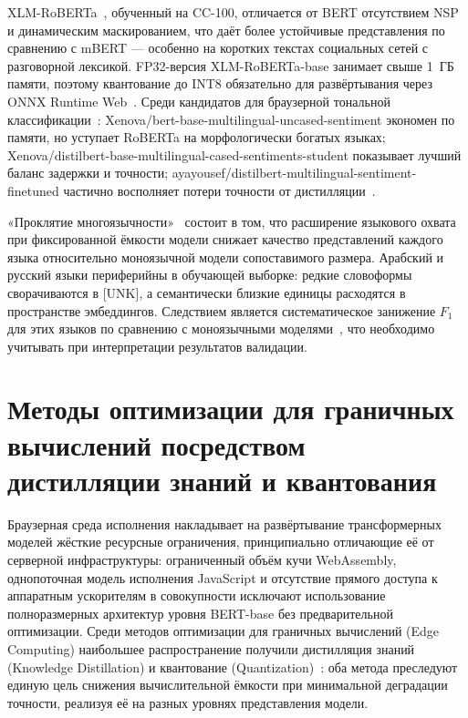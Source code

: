 XLM-RoBERTa~\cite{conneau2020unsupervised}, обученный на CC-100, отличается от BERT отсутствием NSP и динамическим маскированием, что даёт более устойчивые представления по сравнению с mBERT — особенно на коротких текстах социальных сетей с разговорной лексикой. FP32-версия XLM-RoBERTa-base занимает свыше 1~ГБ памяти, поэтому квантование до INT8 обязательно для развёртывания через ONNX Runtime Web~\cite{gholami2021quantization}. Среди кандидатов для браузерной тональной классификации~\cite{qin2024multilingual}: Xenova/bert-base-multilingual-uncased-sentiment экономен по памяти, но уступает RoBERTa на морфологически богатых языках; Xenova/distilbert-base-multilingual-cased-sentiments-student показывает лучший баланс задержки и точности; ayayousef/distilbert-multilingual-sentiment-finetuned частично восполняет потери точности от дистилляции~\cite{xu2024distillation}.

«Проклятие многоязычности»~\cite{pfeiffer2022lifting} состоит в том, что расширение языкового охвата при фиксированной ёмкости модели снижает качество представлений каждого языка относительно моноязычной модели сопоставимого размера. Арабский и русский языки периферийны в обучающей выборке: редкие словоформы сворачиваются в [UNK], а семантически близкие единицы расходятся в пространстве эмбеддингов. Следствием является систематическое занижение $F_1$ для этих языков по сравнению с моноязычными моделями~\cite{rust2021multilingual}, что необходимо учитывать при интерпретации результатов валидации.

\section{Методы оптимизации для граничных вычислений посредством дистилляции знаний и квантования}
\label{sec:методы_оптимизации_для_граничных_вычислений_посредством_дистилляции_знаний_и_квантования}

Браузерная среда исполнения накладывает на развёртывание трансформерных моделей жёсткие ресурсные ограничения, принципиально отличающие её от серверной инфраструктуры: ограниченный объём кучи WebAssembly, однопоточная модель исполнения JavaScript и отсутствие прямого доступа к аппаратным ускорителям в совокупности исключают использование полноразмерных архитектур уровня BERT-base без предварительной оптимизации. Среди методов оптимизации для граничных вычислений (Edge Computing) наибольшее распространение получили дистилляция знаний (Knowledge Distillation) и квантование (Quantization)~\cite{menghani2023efficient}: оба метода преследуют единую цель снижения вычислительной ёмкости при минимальной деградации точности, реализуя её на разных уровнях представления модели.

